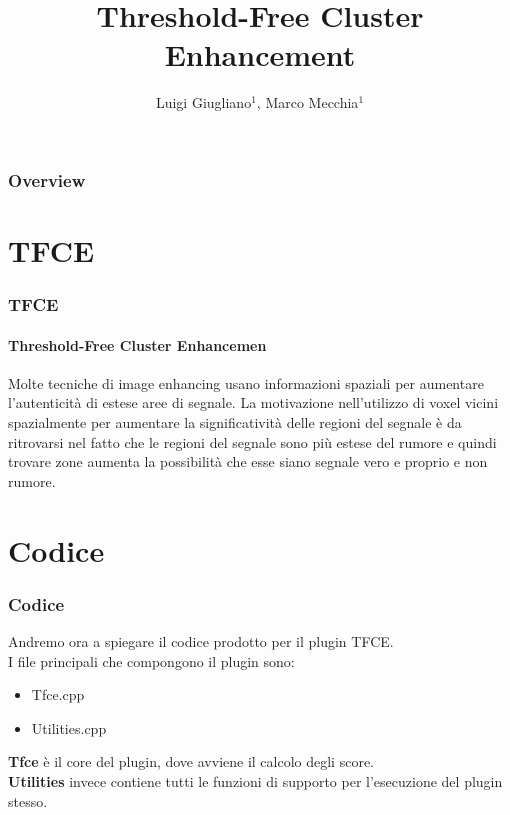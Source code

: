 \documentclass{beamer}
\title{Threshold-Free Cluster Enhancement}
\author{Luigi Giugliano$^1$, Marco Mecchia$^1$}
\institute{$^1$Università degli studi di Salerno}
\begin{document}
\begin{frame}
   \maketitle
\end{frame}

\begin{frame}
  \frametitle{Overview}
  \footnotesize \tableofcontents
\end{frame}


\section{TFCE}
\begin{frame}
\frametitle{TFCE}
\framesubtitle{Threshold-Free Cluster Enhancemen}
Molte tecniche di image enhancing usano informazioni spaziali per aumentare l'autenticità di estese aree di segnale. La motivazione nell'utilizzo di voxel vicini spazialmente per aumentare la significatività delle regioni del segnale è da ritrovarsi nel fatto che le regioni del segnale sono più estese del rumore e quindi trovare zone aumenta la possibilità che esse siano segnale vero e proprio e non rumore.\\
\medskip 

\end{frame}


\section{Codice}
\begin{frame}
\frametitle{Codice}
Andremo ora a spiegare il codice prodotto  per il plugin TFCE.\\
\medskip
I file principali che compongono il plugin sono:
\begin{itemize}
\item{Tfce.cpp}
\item{Utilities.cpp}
\end{itemize}
\textbf{Tfce} è il core del plugin, dove avviene il  calcolo degli score.\\
\smallskip
\textbf{Utilities} invece contiene tutti le funzioni di supporto per l'esecuzione del plugin stesso.
\end{frame}
\end{document}
